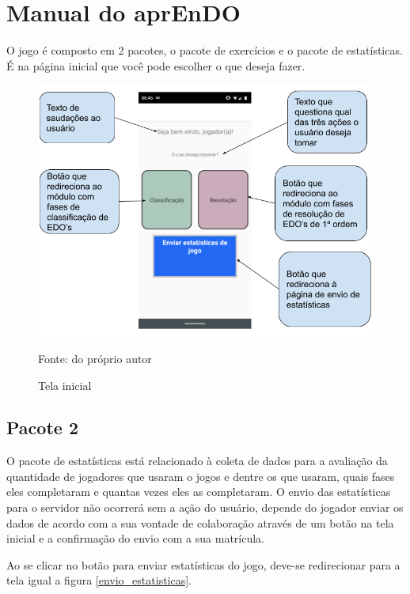 \chapter[Manual do aprEnDO]{Manual do aprEnDO}
O jogo é composto em 2 pacotes, o pacote de exercícios e o pacote de estatísticas. É na página inicial que você pode escolher o que deseja fazer.

\begin{figure}[H]
\centering
\caption{Tela inicial}
\includegraphics[scale=0.32]{figuras/tela_inicial.png}
\label{tela_inicial}

\small{Fonte: do próprio autor}
\end{figure}



\section[Pacote 2]{Pacote 2}
O pacote de estatísticas está relacionado à coleta de dados para a avaliação da quantidade de jogadores que usaram o jogos e dentre os que usaram, quais fases eles completaram e quantas vezes eles as completaram. O envio das estatísticas para o servidor não ocorrerá sem a ação do usuário, depende do jogador enviar os dados de acordo com a sua vontade de colaboração através de um botão na tela inicial e a confirmação do envio com a sua matrícula.

Ao se clicar no botão para enviar estatísticas do jogo, deve-se redirecionar para a tela igual a figura \ref{envio_estatisticas}.


